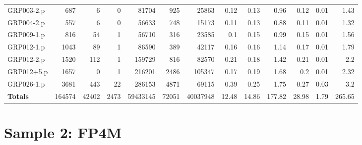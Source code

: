 \begin{table}[H]
\begin{adjustwidth}{-0.4in}{-0.5in}
\begin{tabular}{| l || r | r | r || r | r | r || r | r | r | r | r | r |}
GRP003-2.p&687&6&0&81704&925&25863&0.12&0.13&0.96&0.12&0.01&1.43\\
GRP004-2.p&557&6&0&56633&748&15173&0.11&0.13&0.88&0.11&0.01&1.32\\
GRP009-1.p&816&54&1&56710&316&23585&0.1&0.15&0.99&0.15&0.01&1.56\\
GRP012-1.p&1043&89&1&86590&389&42117&0.16&0.16&1.14&0.17&0.01&1.79\\
GRP012-2.p&1520&112&1&159729&816&82570&0.21&0.18&1.42&0.21&0.01&2.2\\
GRP012+5.p&1657&0&1&216201&2486&105347&0.17&0.19&1.68&0.2&0.01&2.32\\
GRP026-1.p&3681&443&22&286153&4871&69115&0.39&0.25&1.75&0.27&0.03&3.2\\ \hline \hline
\textbf{Totals}&164574&42402&2473&59433145&72051&40037948&12.48&14.86&177.82&28.98&1.79&265.65\\ \hline
\end{tabular}\end{adjustwidth}\end{table}

\section{Sample 2: FP4M}


